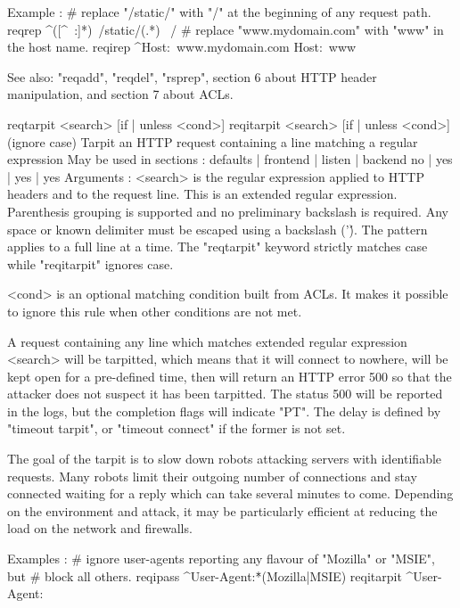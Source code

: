   Example :
     # replace "/static/" with "/" at the beginning of any request path.
     reqrep ^([^\ :]*)\ /static/(.*)     \1\ /\2
     # replace "www.mydomain.com" with "www" in the host name.
     reqirep ^Host:\ www.mydomain.com   Host:\ www

  See also: "reqadd", "reqdel", "rsprep", section 6 about HTTP header
            manipulation, and section 7 about ACLs.


reqtarpit  <search> [{if | unless} <cond>]
reqitarpit <search> [{if | unless} <cond>]  (ignore case)
  Tarpit an HTTP request containing a line matching a regular expression
  May be used in sections :   defaults | frontend | listen | backend
                                 no    |    yes   |   yes  |   yes
  Arguments :
    <search>  is the regular expression applied to HTTP headers and to the
              request line. This is an extended regular expression. Parenthesis
              grouping is supported and no preliminary backslash is required.
              Any space or known delimiter must be escaped using a backslash
              ('\'). The pattern applies to a full line at a time. The
              "reqtarpit" keyword strictly matches case while "reqitarpit"
              ignores case.

    <cond>    is an optional matching condition built from ACLs. It makes it
              possible to ignore this rule when other conditions are not met.

  A request containing any line which matches extended regular expression
  <search> will be tarpitted, which means that it will connect to nowhere, will
  be kept open for a pre-defined time, then will return an HTTP error 500 so
  that the attacker does not suspect it has been tarpitted. The status 500 will
  be reported in the logs, but the completion flags will indicate "PT". The
  delay is defined by "timeout tarpit", or "timeout connect" if the former is
  not set.

  The goal of the tarpit is to slow down robots attacking servers with
  identifiable requests. Many robots limit their outgoing number of connections
  and stay connected waiting for a reply which can take several minutes to
  come. Depending on the environment and attack, it may be particularly
  efficient at reducing the load on the network and firewalls.

  Examples :
     # ignore user-agents reporting any flavour of "Mozilla" or "MSIE", but
     # block all others.
     reqipass   ^User-Agent:\.*(Mozilla|MSIE)
     reqitarpit ^User-Agent:

